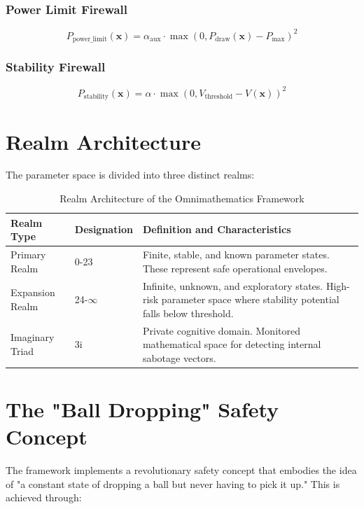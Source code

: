 \documentclass[12pt]{article}
\begin{document}
\subsubsection{Power Limit Firewall}
\begin{equation}
P_{\text{power\_limit}}(\mathbf{x}) = \alpha_{\text{aux}} \cdot \max(0, P_{\text{draw}}(\mathbf{x}) - P_{\text{max}})^2
\end{equation}

\subsubsection{Stability Firewall}
\begin{equation}
P_{\text{stability}}(\mathbf{x}) = \alpha \cdot \max(0, V_{\text{threshold}} - V(\mathbf{x}))^2
\end{equation}

\section{Realm Architecture}

The parameter space is divided into three distinct realms:

\begin{table}[H]
\centering
\begin{tabular}{@{}lll@{}}
\toprule
Realm Type & Designation & Definition and Characteristics \\
\midrule
Primary Realm & 0-23 & Finite, stable, and known parameter states. These represent safe operational envelopes. \\
Expansion Realm & 24-$\infty$ & Infinite, unknown, and exploratory states. High-risk parameter space where stability potential falls below threshold. \\
Imaginary Triad & 3i & Private cognitive domain. Monitored mathematical space for detecting internal sabotage vectors. \\
\bottomrule
\end{tabular}
\caption{Realm Architecture of the Omnimathematics Framework}
\end{table}

\section{The "Ball Dropping" Safety Concept}

The framework implements a revolutionary safety concept that embodies the idea of "a constant state of dropping a ball but never having to pick it up." This is achieved through:
\end{document}
